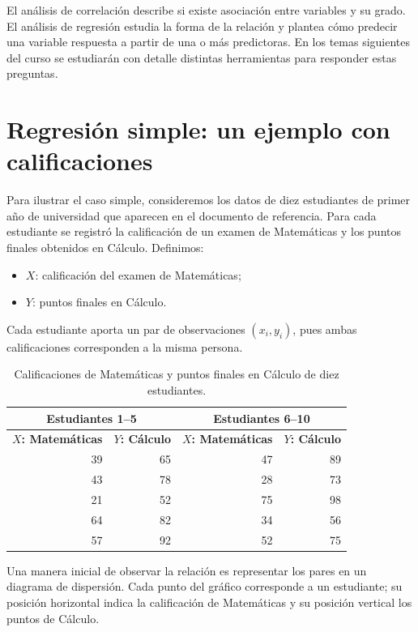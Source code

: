 El análisis de correlación describe si existe asociación entre variables y su grado. El análisis de regresión estudia la forma de la relación y plantea cómo predecir una variable respuesta a partir de una o más predictoras. En los temas siguientes del curso se estudiarán con detalle distintas herramientas para responder estas preguntas.

\section{Regresión simple: un ejemplo con calificaciones}

Para ilustrar el caso simple, consideremos los datos de diez estudiantes de primer año de universidad que aparecen en el documento de referencia. Para cada estudiante se registró la calificación de un examen de Matemáticas y los puntos finales obtenidos en Cálculo. Definimos:
\begin{itemize}
    \item $X$: calificación del examen de Matemáticas;
    \item $Y$: puntos finales en Cálculo.
\end{itemize}

Cada estudiante aporta un par de observaciones $(x_i,y_i)$, pues ambas calificaciones corresponden a la misma persona.

\begin{table}[H]
\centering
\small
\renewcommand{\arraystretch}{1.15}
\begin{tabular}{|r|r|r|r|}
\hline
\multicolumn{2}{|c|}{\textbf{Estudiantes 1--5}} & \multicolumn{2}{c|}{\textbf{Estudiantes 6--10}} \\ \hline
\textbf{$X$: Matemáticas} & \textbf{$Y$: Cálculo} & \textbf{$X$: Matemáticas} & \textbf{$Y$: Cálculo} \\ \hline
39 & 65 & 47 & 89 \\ \hline
43 & 78 & 28 & 73 \\ \hline
21 & 52 & 75 & 98 \\ \hline
64 & 82 & 34 & 56 \\ \hline
57 & 92 & 52 & 75 \\ \hline
\end{tabular}
\caption{Calificaciones de Matemáticas y puntos finales en Cálculo de diez estudiantes.}
\label{tab:calificaciones-regresion}
\end{table}

Una manera inicial de observar la relación es representar los pares en un diagrama de dispersión. Cada punto del gráfico corresponde a un estudiante; su posición horizontal indica la calificación de Matemáticas y su posición vertical los puntos de Cálculo.

